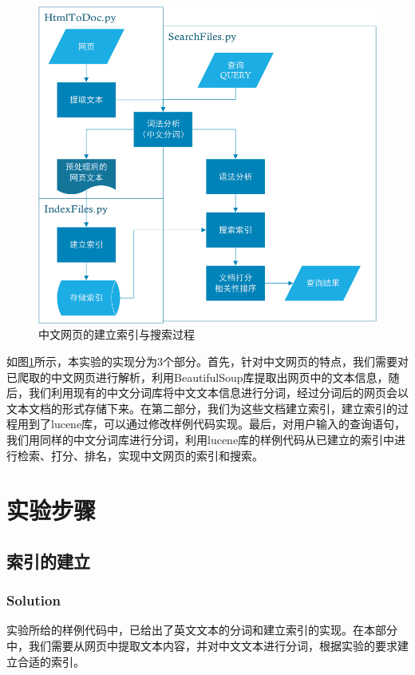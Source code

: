 \documentclass{article}
\begin{document}
\begin{figure}[htbp]
\centering
\includegraphics[width=12.5cm]{img/flowchart.png}
\caption{中文网页的建立索引与搜索过程}
\label{fig:flowchart}
\end{figure}

如图\ref{fig:flowchart}所示，本实验的实现分为3个部分。首先，针对中文网页的特点，我们需要对已爬取的中文网页进行解析，利用BeautifulSoup库提取出网页中的文本信息，随后，我们利用现有的中文分词库将中文文本信息进行分词，经过分词后的网页会以文本文档的形式存储下来。在第二部分，我们为这些文档建立索引，建立索引的过程用到了lucene库，可以通过修改样例代码实现。最后，对用户输入的查询语句，我们用同样的中文分词库进行分词，利用lucene库的样例代码从已建立的索引中进行检索、打分、排名，实现中文网页的索引和搜索。


\section{实验步骤}
\subsection{索引的建立}


\subsubsection{Solution}

实验所给的样例代码中，已给出了英文文本的分词和建立索引的实现。在本部分中，我们需要从网页中提取文本内容，并对中文文本进行分词，根据实验的要求建立合适的索引。
\end{document}
